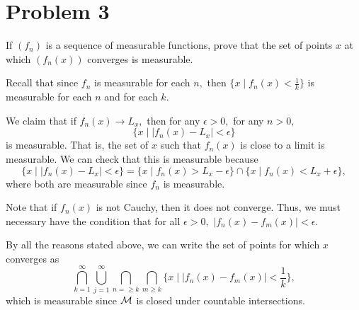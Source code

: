 \documentclass[11pt]{article}
\begin{document}
\section*{Problem 3}
\begin{problem}
    If $(f_n)$ is a sequence of measurable functions, prove that the set of points $x$ at which $(f_n(x))$ converges is measurable.
\end{problem}
\begin{solution}
    Recall that since $f_n$ is measurable for each $n,$ then 
    $\{x \mid f_n(x) < \frac{1}{k}\}$ is measurable for each $n$ and for each $k.$ 

    We claim that if $f_n(x) \to L_x,$ then for any $\epsilon>0,$ for any $n>0,$
    \[\{x \mid |f_n(x) - L_x| < \epsilon\}\] is measurable. That is, the set of $x$ such that $f_n(x)$ is close to a limit is measurable. We can check that this is measurable because 
    \[\{x \mid |f_n(x) - L_x| < \epsilon\} = \{x \mid f_n(x) > L_x - \epsilon\} \cap \{x \mid f_n(x) < L_x + \epsilon\},\] where both are measurable since $f_n$ is measurable.

    Note that if $f_n(x)$ is not Cauchy, then it does not converge. Thus, we must necessary have the condition that for all $\epsilon>0,$ $|f_n(x) - f_m(x)| < \epsilon.$

    By all the reasons stated above, we can write the set of points for which $x$ converges as 
    \[\bigcap_{k=1}^\infty \bigcup_{j = 1}^\infty\bigcap_{n=\geq k} \bigcap_{m \geq k}\{x \mid |f_n(x) - f_m(x)| < \frac{1}{k}\},\] which is measurable since $\cal M$ is closed under countable intersections.
\end{solution}

\newpage
\end{document}

